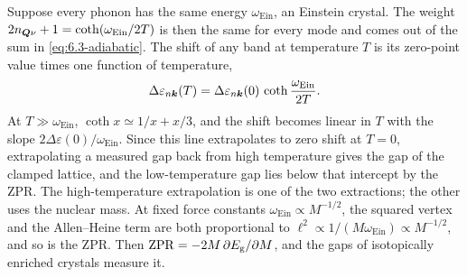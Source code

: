 Suppose every phonon has the same energy $\omega_{\mathrm{Ein}}$, an Einstein crystal. The weight $2n_{\bm{Q}\nu} + 1 = \coth(\omega_{\mathrm{Ein}}/2T)$ is then the same for every mode and comes out of the sum in \cref{eq:6.3-adiabatic}. The shift of any band at temperature $T$ is its zero-point value times one function of temperature,
\begin{equation}
  \Delta\varepsilon_{n\bm{k}}(T) = \Delta\varepsilon_{n\bm{k}}(0)\,\coth\frac{\omega_{\mathrm{Ein}}}{2T} .
  \label{eq:6.3-einstein}
\end{equation}
At $T \gg \omega_{\mathrm{Ein}}$, $\coth x \simeq 1/x + x/3$, and the shift becomes linear in $T$ with the slope $2\Delta\varepsilon(0)/\omega_{\mathrm{Ein}}$. Since this line extrapolates to zero shift at $T = 0$, extrapolating a measured gap back from high temperature gives the gap of the clamped lattice, and the low-temperature gap lies below that intercept by the ZPR. The high-temperature extrapolation is one of the two extractions; the other uses the nuclear mass. At fixed force constants $\omega_{\mathrm{Ein}} \propto M^{-1/2}$, the squared vertex and the Allen--Heine term are both proportional to $\ell^2 \propto 1/(M\omega_{\mathrm{Ein}}) \propto M^{-1/2}$, and so is the ZPR. Then $\mathrm{ZPR} = -2M\,\partial E_{\mathrm{g}}/\partial M$, and the gaps of isotopically enriched crystals measure it.


